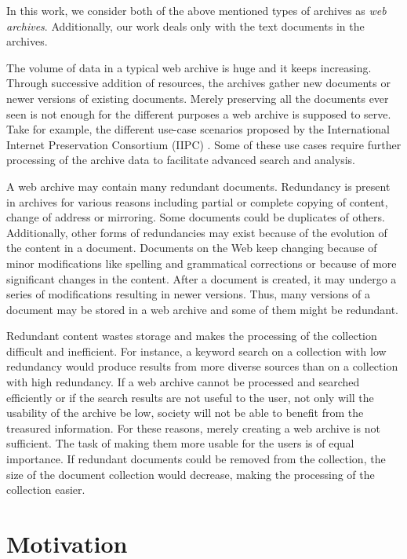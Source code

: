 In this work, we consider both of the above mentioned types of archives as
\emph{web archives}. Additionally, our work deals only with the text documents
in the archives.

The volume of data in a typical web archive is huge and it keeps increasing.
Through successive addition of resources, the archives gather new documents or
newer versions of existing documents. Merely preserving all the documents ever
seen is not enough for the different purposes a web archive is supposed to
serve. Take for example, the different use-case scenarios proposed by the
International Internet Preservation Consortium (IIPC) \cite{IIPC:2006}. Some of
these use cases require further processing of the archive data to facilitate
advanced search and analysis. 

A web archive may contain many redundant documents. Redundancy is present in
archives for various reasons including partial or complete copying of
content, change of address or mirroring. Some documents could be duplicates of
others. Additionally, other forms of redundancies may exist because of the
evolution of the content in a document. Documents on the Web keep changing
because of minor modifications like spelling and grammatical corrections or
because of more significant changes in the content. After a document is created,
it may undergo a series of modifications resulting in newer versions. Thus,
many versions of a document may be stored in a web archive and some of them
might be redundant. 

Redundant content wastes storage and makes the processing of the collection
difficult and inefficient. For instance, a keyword search on a collection with low redundancy
would produce results from more diverse sources than on a collection with high
redundancy. If a web archive cannot be processed and searched efficiently or if
the search results are not useful to the user, not only will the usability of
the archive be low, society will not be able to benefit from the treasured
information. For these reasons, merely creating a web archive is not sufficient.
The task of making them more usable for the users is of equal importance.  If
redundant documents could be removed from the collection, the size of the
document collection would decrease, making the processing of the collection
easier.

\section{Motivation}

